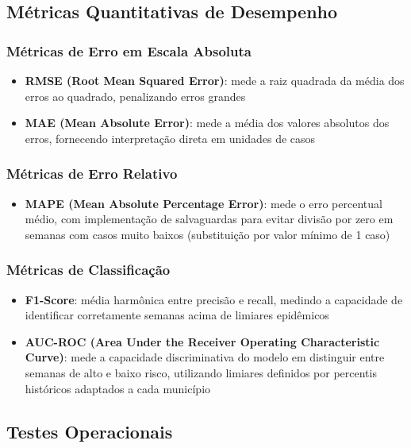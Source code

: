\subsection{Métricas Quantitativas de Desempenho}

\subsubsection{Métricas de Erro em Escala Absoluta}

\begin{itemize}
    \item \textbf{RMSE (Root Mean Squared Error)}: mede a raiz quadrada da média dos erros ao quadrado, penalizando erros grandes
    \item \textbf{MAE (Mean Absolute Error)}: mede a média dos valores absolutos dos erros, fornecendo interpretação direta em unidades de casos
\end{itemize}

\subsubsection{Métricas de Erro Relativo}

\begin{itemize}
    \item \textbf{MAPE (Mean Absolute Percentage Error)}: mede o erro percentual médio, com implementação de salvaguardas para evitar divisão por zero em semanas com casos muito baixos (substituição por valor mínimo de 1 caso)
\end{itemize}

\subsubsection{Métricas de Classificação}

\begin{itemize}
    \item \textbf{F1-Score}: média harmônica entre precisão e recall, medindo a capacidade de identificar corretamente semanas acima de limiares epidêmicos
    \item \textbf{AUC-ROC (Area Under the Receiver Operating Characteristic Curve)}: mede a capacidade discriminativa do modelo em distinguir entre semanas de alto e baixo risco, utilizando limiares definidos por percentis históricos adaptados a cada município
\end{itemize}

\subsection{Testes Operacionais}

